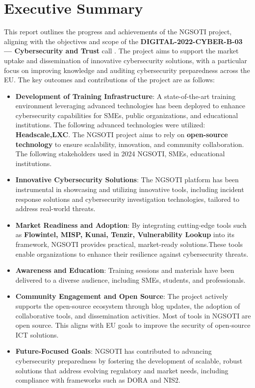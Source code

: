 
\section*{Executive Summary}

This report outlines the progress and achievements of the NGSOTI project,
aligning with the objectives and scope of the
\textbf{DIGITAL-2022-CYBER-B-03 — Cybersecurity and Trust} call \cite{EU2022CyberTrust}.
The project aims to support the market uptake and dissemination of innovative
cybersecurity solutions, with a particular focus on improving knowledge and
auditing cybersecurity preparedness across the EU.
The key outcomes and contributions of the project are as follows:

\begin{itemize}
    \item \textbf{Development of Training Infrastructure}: A state-of-the-art
training environment leveraging advanced technologies has been deployed to
enhance cybersecurity capabilities for SMEs, public organizations, and
educational institutions. The following advanced technologies were utilized:
\textbf{Headscale,LXC}. The NGSOTI project
aims to rely on \textbf{open-source technology} to ensure scalability, innovation,
and community collaboration. The following stakeholders used in 2024 NGSOTI,
SMEs, educational institutions.

    \item \textbf{Innovative Cybersecurity Solutions}: The NGSOTI platform has been instrumental in showcasing and utilizing innovative tools, including incident response solutions and cybersecurity investigation technologies, tailored to address real-world threats.

    \item \textbf{Market Readiness and Adoption}: By integrating cutting-edge
tools such as \textbf{Flowintel, MISP, Kunai, Tenzir, Vulnerability Lookup} into its framework,
NGSOTI provides practical, market-ready solutions.These tools enable
organizations to enhance their resilience against cybersecurity threats.

    \item \textbf{Awareness and Education}: Training sessions and materials
have been delivered to a diverse audience, including SMEs, students, and professionals.
 
    \item \textbf{Community Engagement and Open Source}: The project actively
supports the open-source ecosystem through blog updates, the adoption of
collaborative tools, and dissemination activities. Most of tools in NGSOTI are open source.
This aligns with EU goals to improve the security of open-source ICT solutions.

    \item \textbf{Future-Focused Goals}: NGSOTI has contributed to advancing
cybersecurity preparedness by fostering the development of scalable, robust
solutions that address evolving regulatory and market needs, including
compliance with frameworks such as DORA and NIS2.
\end{itemize}


